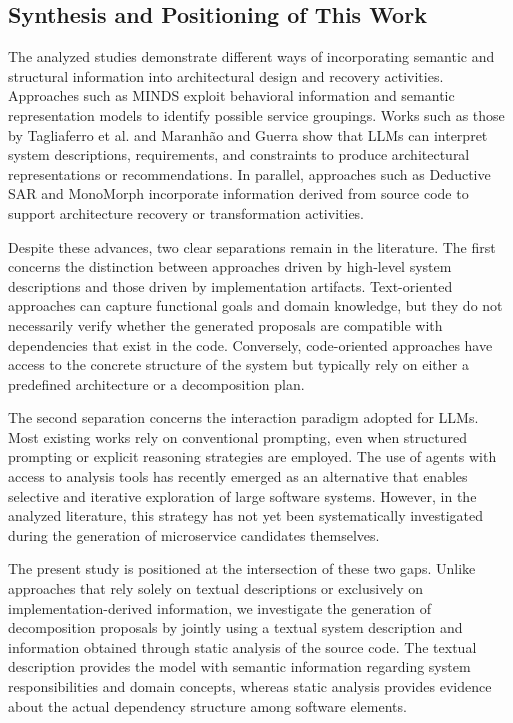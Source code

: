 \documentclass[acmsmall,screen,anonymous,review]{acmart}
\begin{document}
\subsection{Synthesis and Positioning of This Work}

The analyzed studies demonstrate different ways of incorporating semantic and structural information into architectural design and recovery activities. Approaches such as MINDS exploit behavioral information and semantic representation models to identify possible service groupings. Works such as those by Tagliaferro et al. and Maranhão and Guerra show that LLMs can interpret system descriptions, requirements, and constraints to produce architectural representations or recommendations. In parallel, approaches such as Deductive SAR and MonoMorph incorporate information derived from source code to support architecture recovery or transformation activities.

Despite these advances, two clear separations remain in the literature. The first concerns the distinction between approaches driven by high-level system descriptions and those driven by implementation artifacts. Text-oriented approaches can capture functional goals and domain knowledge, but they do not necessarily verify whether the generated proposals are compatible with dependencies that exist in the code. Conversely, code-oriented approaches have access to the concrete structure of the system but typically rely on either a predefined architecture or a decomposition plan.

The second separation concerns the interaction paradigm adopted for LLMs. Most existing works rely on conventional prompting, even when structured prompting or explicit reasoning strategies are employed. The use of agents with access to analysis tools has recently emerged as an alternative that enables selective and iterative exploration of large software systems. However, in the analyzed literature, this strategy has not yet been systematically investigated during the generation of microservice candidates themselves.

The present study is positioned at the intersection of these two gaps. Unlike approaches that rely solely on textual descriptions or exclusively on implementation-derived information, we investigate the generation of decomposition proposals by jointly using a textual system description and information obtained through static analysis of the source code. The textual description provides the model with semantic information regarding system responsibilities and domain concepts, whereas static analysis provides evidence about the actual dependency structure among software elements.
\end{document}
